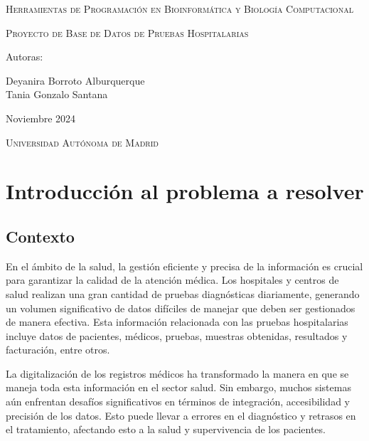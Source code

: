 \documentclass[spanish]{article}
\begin{document}
	\begin{titlepage}
		\centering
		\vspace{4cm}
		{\scshape\Large Herramientas de Programación en Bioinformática y Biología Computacional \par}
		\vspace{6cm}
		{\scshape\Huge Proyecto de Base de Datos de Pruebas Hospitalarias \par}
		\vfill
		{\Large Autoras: \par}
		{\Large Deyanira Borroto Alburquerque\\
        		Tania Gonzalo Santana \par}
		\vfill
		{\Large Noviembre 2024 \par}
		{\scshape\normalsize Universidad Autónoma de Madrid \par}
\end{titlepage}


\tableofcontents


\newpage %

\section{Introducción al problema a resolver}

\subsection{Contexto}

En el ámbito de la salud, la gestión eficiente y precisa de la información es crucial para garantizar la calidad de la atención médica. Los hospitales y centros de salud realizan una gran cantidad de pruebas diagnósticas diariamente, generando un volumen significativo de datos difíciles de manejar que deben ser gestionados de manera efectiva. Esta información relacionada con las pruebas hospitalarias incluye datos de pacientes, médicos, pruebas, muestras obtenidas, resultados y facturación, entre otros.

La digitalización de los registros médicos ha transformado la manera en que se maneja toda esta información en el sector salud. Sin embargo, muchos sistemas aún enfrentan desafíos significativos en términos de integración, accesibilidad y precisión de los datos. Esto puede llevar a errores en el diagnóstico y retrasos en el tratamiento, afectando esto a la salud y supervivencia de los pacientes.
\end{document}
